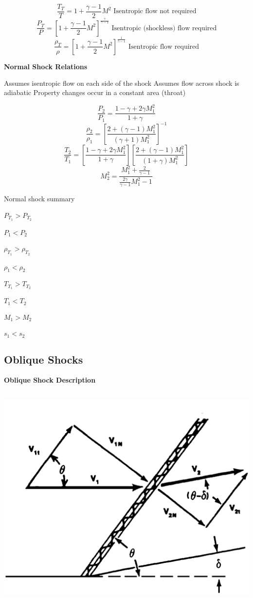 \documentclass[
]{book}
\begin{document}
\[\frac{T_T}{T} = 1 + \frac{\gamma -1}{2}M^2 \text{   Isentropic flow not required}\]
\[\frac{P_T}{P} = \left[1 + \frac{\gamma - 1}{2}M^2 \right]^{\frac{\gamma}{\gamma-1}} \text{   Isentropic (shockless) flow required}\]
\[\frac{\rho_T}{\rho} = \left[1 + \frac{\gamma - 1}{2} M^2 \right]^{\frac{1}{\gamma -1}} \text{   Isentropic flow required} \]

\textbf{Normal Shock Relations}

Assumes isentropic flow on each side of the shock
Assumes flow across shock is adiabatic
Property changes occur in a constant area (throat)

\[\frac{P_2}{P_1} = \frac{1 - \gamma + 2\gamma M_1^2}{1+\gamma} \]
\[\frac{\rho_2}{\rho_1} = \left[\frac{2 + \left(\gamma - 1\right) M_1^2}{\left(\gamma+1\right) M_1^2} \right]^{-1} \]
\[\frac{T_2}{T_1} = \left[\frac{1 - \gamma + 2\gamma M_1^2}{1 + \gamma} \right]\left[\frac{2 + \left(\gamma - 1\right) M_1^2}{\left(1 + \gamma\right) M_1^2} \right] \]
\[M_2^2 = \frac{M_1^2 + \frac{2}{\gamma - 1}}{\frac{2\gamma}{\gamma-1} M_1^2-1} \]

Normal shock summary

\(P_{T_1} > P_{T_2}\)

\(P_{1} < P_{2}\)

\(\rho_{T_1} > \rho_{T_2}\)

\(\rho_{1} < \rho_{2}\)

\(T_{T_1} > T_{T_2}\)

\(T_{1} < T_{2}\)

\(M_1 > M_2\)

\(s_1 < s_2\)

\hypertarget{oblique-shocks}{%
\subsection{Oblique Shocks}\label{oblique-shocks}}

\textbf{Oblique Shock Description}

\includegraphics[width=7.124in,height=4.5in]{media/05/image59.svg}
\end{document}

